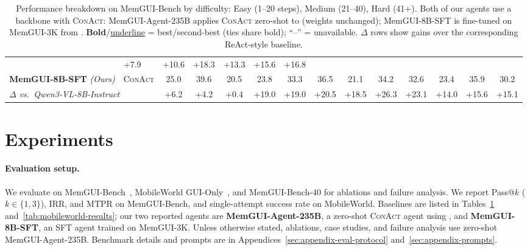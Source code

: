 \documentclass{llmxive}
\providecommand{\llmname}[1]{{\fontfamily{pcr}\selectfont{#1}}}
\providecommand{\ourmethod}{MemGUI-Agent\xspace}
\providecommand{\conact}{\textsc{ConAct}\xspace}
\providecommand{\rise}[1]{#1}
\begin{document}
\begin{table}[t]
\begin{adjustbox}{max width=\textwidth}
\begin{tabular}{@{}ll | ccc | ccc | ccc | ccc@{}}
      & {\footnotesize\rise{+7.9}} & {\footnotesize\rise{+10.6}} & {\footnotesize\rise{+18.3}}
      & {\footnotesize\rise{+13.3}} & {\footnotesize\rise{+15.6}} & {\footnotesize\rise{+16.8}} \\
    \addlinespace[2pt]
    \rowcolor{oursrowcolor} \textbf{MemGUI-8B-SFT} \textit{(Ours)} & \conact & 25.0 & 39.6 & 20.5 & 23.8 & 33.3 & 36.5 & 21.1 & 34.2 & 32.6 & 23.4 & 35.9 & 30.2 \\[-2pt]
    \multicolumn{2}{l|}{\quad\textit{\footnotesize $\Delta$ vs.\ Qwen3-VL-8B-Instruct}}
      & {\footnotesize\rise{+6.2}} & {\footnotesize\rise{+4.2}} & {\footnotesize\rise{+0.4}}
      & {\footnotesize\rise{+19.0}} & {\footnotesize\rise{+19.0}} & {\footnotesize\rise{+20.5}}
      & {\footnotesize\rise{+18.5}} & {\footnotesize\rise{+26.3}} & {\footnotesize\rise{+23.1}}
      & {\footnotesize\rise{+14.0}} & {\footnotesize\rise{+15.6}} & {\footnotesize\rise{+15.1}} \\
    \bottomrule
  \end{tabular}%
  \end{adjustbox}
  \vspace{-2mm}
  \caption{Performance breakdown on MemGUI-Bench by difficulty: Easy (1--20 steps), Medium (21--40), Hard (41+). Both of our agents use a \llmname{Qwen3-VL} backbone with \conact: \ourmethod-235B applies \conact zero-shot to \llmname{Qwen3-VL-235B-Thinking} (weights unchanged); MemGUI-8B-SFT is fine-tuned on MemGUI-3K from \llmname{Qwen3-VL-8B-Instruct}. \textbf{Bold}/\underline{underline} = best/second-best (ties share bold); ``--'' = unavailable. $\Delta$ rows show gains over the corresponding ReAct-style baseline.}
  \label{tab:main-results}
\end{table}

\section{Experiments}
\label{sec:experiments}
\setcounter{insight}{0}
\vspace{-0.25em}

\paragraph{Evaluation setup.}
We evaluate on MemGUI-Bench~\cite{liu2026memgui}, MobileWorld GUI-Only~\cite{kong2025mobileworld}, and MemGUI-Bench-40 for ablations and failure analysis. We report Pass@$k$ ($k{\in}\{1,3\}$), IRR, and MTPR on MemGUI-Bench, and single-attempt success rate on MobileWorld. Baselines are listed in Tables~\ref{tab:main-results} and~\ref{tab:mobileworld-results}; our two reported agents are \textbf{\ourmethod-235B}, a zero-shot \conact agent using \llmname{Qwen3-VL-235B-Thinking}, and \textbf{MemGUI-8B-SFT}, an SFT \llmname{Qwen3-VL-8B-Instruct} agent trained on MemGUI-3K. Unless otherwise stated, ablations, case studies, and failure analysis use zero-shot \ourmethod-235B. Benchmark details and prompts are in Appendices~\ref{sec:appendix-eval-protocol} and~\ref{sec:appendix-prompts}.
\end{document}
